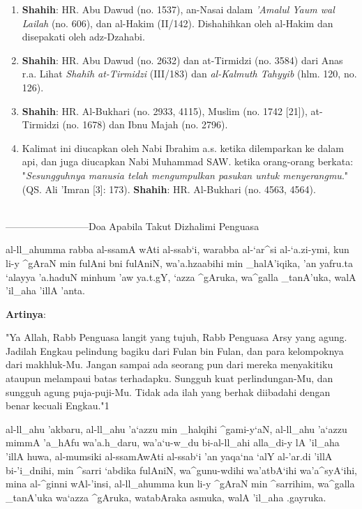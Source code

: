 \documentclass[a4paper,12pt]{article}
\begin{document}
\begin{enumerate}
\item \textbf{Shahih}: HR. Abu Dawud (no. 1537), an-Nasai dalam 
\textit{'Amalul Yaum wal Lailah} (no. 606), dan al-Hakim (II/142). 
Dishahihkan oleh al-Hakim dan disepakati oleh adz-Dzahabi.
\item \textbf{Shahih}: HR. Abu Dawud (no. 2632) dan at-Tirmidzi (no. 3584) 
dari Anas r.a. Lihat \textit{Shah\^{i}h at-Tirmidzi} (III/183) dan 
\textit{al-Kalmuth Tahyyib} (hlm. 120, no. 126).     
\item \textbf{Shahih}: HR. Al-Bukhari (no. 2933, 4115), Muslim (no.  1742 
[21]), at-Tirmidzi (no. 1678) dan Ibnu Majah (no. 2796).
\item Kalimat ini diucapkan oleh Nabi Ibrahim a.s. ketika dilemparkan ke 
dalam api, dan juga diucapkan Nabi Muhammad SAW. ketika orang-orang 
berkata: "\textit{Sesungguhnya manusia telah mengumpulkan pasukan untuk 
menyerangmu}." (QS. Ali 'Imran [3]: 173). \textbf{Shahih}: HR. Al-Bukhari 
(no. 4563, 4564).\\\\
\end{enumerate}
\par
{}--------------------------Doa Apabila Takut Dizhalimi Penguasa
\begin{arabtext}
\noindent
al-ll_ahumma rabba al-ssamA wAti al-ssab`i, warabba al-`ar^si al-`a.zi-ymi, 
kun li-y ^gAraN min fulAni bni fulAniN, wa'a.hzaabihi min _halA'iqika, 'an 
yafru.ta `alayya 'a.haduN minhum 'aw ya.t.gY, `azza ^gAruka, wa^galla 
_tanA'uka, walA 'il_aha 'illA 'anta.\\
\end{arabtext}
\noindent
\textbf{Artinya}:
\par
\indent
"Ya Allah, Rabb Penguasa langit yang tujuh, Rabb Penguasa Arsy yang agung. 
Jadilah Engkau pelindung bagiku dari Fulan bin Fulan, dan para kelompoknya 
dari makhluk-Mu. Jangan sampai ada seorang pun dari mereka menyakitiku 
ataupun melampaui batas terhadapku. Sungguh kuat perlindungan-Mu, dan 
sungguh agung puja-puji-Mu. Tidak ada ilah yang berhak diibadahi dengan 
benar kecuali Engkau."{\scriptsize 1}\\
\begin{arabtext}
\noindent
al-ll_ahu 'akbaru, al-ll_ahu 'a`azzu min _halqihi ^gami-y`aN, al-ll_ahu 
'a`azzu mimmA 'a_hAfu wa'a.h_daru, wa'a`u-w_du bi-al-ll_ahi alla_di-y lA 
'il_aha 'illA huwa, al-mumsiki al-ssamAwAti al-ssab`i 'an yaqa`na `alY 
al-'ar.di 'illA bi-'i_dnihi, min ^sarri `abdika fulAniN, wa^gunu-wdihi 
wa'atbA`ihi wa'a^syA`ihi, mina al-^ginni wAl-'insi, al-ll_ahumma kun li-y 
^gAraN min ^sarrihim, wa^galla _tanA'uka wa`azza ^gAruka, watabAraka 
asmuka, walA 'il_aha .gayruka.\\
\end{arabtext}
\end{document}
